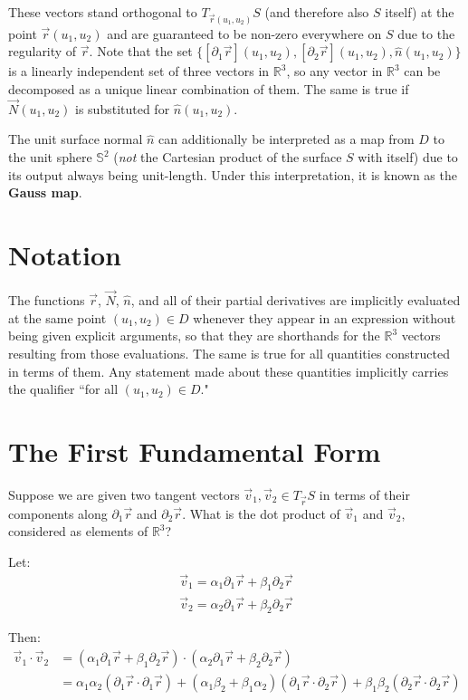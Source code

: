 \documentclass{article}
\begin{document}
These vectors stand orthogonal to $T_{\vec{r}(u_1, u_2)}S$ (and therefore also $S$ itself) at the point $\vec{r}(u_1, u_2)$ and are guaranteed to be non-zero everywhere on $S$ due to the regularity of $\vec{r}$. Note that the set $\{[\partial_1 \vec{r}](u_1, u_2), [\partial_2 \vec{r}](u_1, u_2), \hat{n}(u_1, u_2)\}$ is a linearly independent set of three vectors in $\mathbb{R}^3$, so any vector in $\mathbb{R}^3$ can be decomposed as a unique linear combination of them. The same is true if $\vec{N}(u_1, u_2)$ is substituted for $\hat{n}(u_1, u_2)$.

The unit surface normal $\hat{n}$ can additionally be interpreted as a map from $D$ to the unit sphere $\mathbb{S}^2$ (\textit{not} the Cartesian product of the surface $S$ with itself) due to its output always being unit-length. Under this interpretation, it is known as the \textbf{Gauss map}.

\section{Notation}

The functions ${\vec{r}}$, ${\vec{N}}$, ${\hat{n}}$, and all of their partial derivatives are implicitly evaluated at the same point $(u_1, u_2) \in D$ whenever they appear in an expression without being given explicit arguments, so that they are shorthands for the $\mathbb{R}^3$ vectors resulting from those evaluations. The same is true for all quantities constructed in terms of them. Any statement made about these quantities implicitly carries the qualifier ``for all $(u_1, u_2) \in D$."

\section{The First Fundamental Form}

Suppose we are given two tangent vectors $\vec{v}_1, \vec{v}_2 \in T_{\vec{r}}S$ in terms of their components along $\partial_1 \vec{r}$ and $\partial_2 \vec{r}$. What is the dot product of $\vec{v}_1$ and $\vec{v}_2$, considered as elements of $\mathbb{R}^3$?

Let:
\begin{align*}
  \vec{v}_1 = \alpha_1 \partial_1 \vec{r} + \beta_1 \partial_2 \vec{r} \\
  \vec{v}_2 = \alpha_2 \partial_1 \vec{r} + \beta_2 \partial_2 \vec{r}
\end{align*}

Then:
\begin{align*}
  \vec{v}_1 \cdot \vec{v}_2 &= (\alpha_1 \partial_1 \vec{r} + \beta_1 \partial_2 \vec{r}) \cdot (\alpha_2 \partial_1 \vec{r} + \beta_2 \partial_2 \vec{r}) \\
  &= \alpha_1 \alpha_2 (\partial_1 \vec{r} \cdot \partial_1 \vec{r}) + (\alpha_1 \beta_2 + \beta_1 \alpha_2) (\partial_1 \vec{r} \cdot \partial_2 \vec{r}) + \beta_1 \beta_2 (\partial_2 \vec{r} \cdot \partial_2 \vec{r})
\end{align*}
\end{document}

